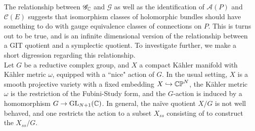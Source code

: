 The relationship between $\mathscr{G}_{\mathbb{C}}$ and $\mathscr{G}$ as well
as the identification of $\mathscr{A}(P)$ and $\mathscr{C}(E)$ suggests
that isomorphism classes of holomorphic bundles should have something to
do with gauge equivalence classes of connections on $P$. This is turns out
to be true, and is an infinite dimensional version of the relationship between
a GIT quotient and a symplectic quotient. To investigate further, we make a short
digression regarding this relationship. \\

Let $G$ be a reductive complex group, and $X$ a compact K\"ahler manifold with K\"ahler
metric $\omega$, equipped with a ``nice" action of $G$. In the usual setting,
$X$ is a smooth projective variety with a fixed embedding $X \hookrightarrow \mathbb{CP}^N$,
the K\"ahler metric $\omega$ is the restriction of the Fubini-Study form,
and the $G$-action is induced by a homomorphism $G \to \mathrm{GL}_{N+1}(\mathbb{C})$. In general,
the na\"ive quotient $X/G$ is not well behaved, and one restricts the action to a
subset $X_{ss}$ consisting of  to construct the
 $X_{ss}/G$. \\

